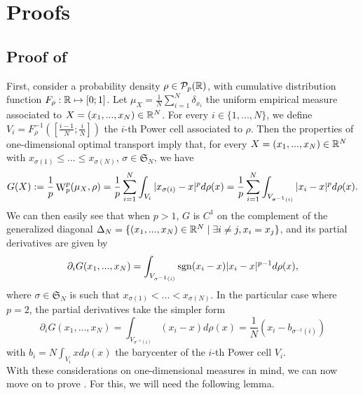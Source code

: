 \onecolumn

\section{Proofs}

\subsection{Proof of \texorpdfstring{}{}}
\label{sec:proof_of_discrete_gradient}

First, consider a probability density $\rho \in \mathcal{P}_p(\mathbb R)$, with cumulative distribution function $F_\rho : \mathbb R \mapsto [0;1]$. 
Let $\mu_X = \frac{1}{N} 
\sum_{i=1}^N \delta_{x_i}$ the uniform empirical measure associated to $X=(x_1,...,x_N) \in \mathbb R^N$. For every $i \in \{1,...,N\}$, we define $V_i = F_\rho^{-1}([\frac{i-1}{N};\frac{i}{N}])$ the $i$-th Power cell associated to $\rho$. Then the properties of one-dimensional optimal transport imply that, for every $X = (x_1,...,x_N) \in \mathbb R^N$ with $x_{\sigma(1)} \leq ... \leq x_{\sigma(N)}$, $\sigma \in \mathfrak{S}_N$, we have 
\begin{equation}
    G(X):=\frac{1}{p} \mathop{\mathrm{W}}\nolimits_p^p(\mu_X, \rho) = \frac{1}{p} \sum_{i=1}^N \int_{V_i} |x_{\sigma(i)} - x|^p d\rho(x) = \frac{1}{p} \sum_{i=1}^N \int_{V_{\sigma^{-1}(i)}} |x_i - x|^p d\rho(x).
\end{equation}
We can then easily see that when $p > 1$, $G$ is $C^1$ on the complement of the generalized diagonal $\Delta_N = \{(x_1,...,x_N) \in \mathbb R^N \mid \exists i \neq j, x_i = x_j \}$, and its partial derivatives are given by 
\begin{equation}
    \partial_i G (x_1,...,x_N) = \int_{V_{\sigma^{-1}(i)}} \mathrm{sgn}(x_i - x)|x_i - x|^{p-1} d\rho(x),
\end{equation}
where $\sigma \in \mathfrak{S}_N$ is such that $x_{\sigma(1)} < ... < x_{\sigma(N)}$. In the particular case where $p = 2$, the partial derivatives take the simpler form 
\begin{equation}
   \partial_i G (x_1,...,x_N) = \int_{V_{\sigma^{-1}(i)}} (x_i - x)d\rho(x) = \frac{1}{N} (x_i - b_{\sigma^{-1}(i)}) 
\end{equation}
with $b_i = N\int_{V_i} xd\rho(x)$ the barycenter of the $i$-th Power cell $V_i$. \\
With these considerations on one-dimensional measures in mind, we can now move on to prove . For this, we will need the following lemma.

